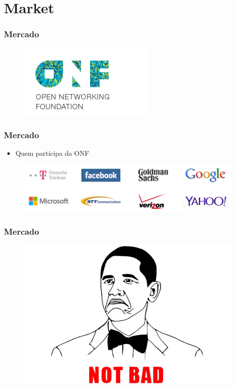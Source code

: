 \section{Market}

%
%
\begin{frame}\frametitle{Mercado}

	\begin{figure}[h]\hspace*{1cm}
        \centering
        \includegraphics[scale=1.0]{images/onf.png}
    \end{figure}
\end{frame}


%
%
\begin{frame}\frametitle{Mercado}

    \begin{itemize}
    \item Quem participa da ONF
    \end{itemize}
    	\begin{figure}[h]\hspace*{-0.3cm}
        \centering
        \includegraphics[scale=0.35]{images/onf-board.png}
    \end{figure}
\end{frame}


%
%
\begin{frame}\frametitle{Mercado}

    	\begin{figure}[h]
        \centering
        \includegraphics[scale=0.2]{images/notbad.png}
    \end{figure}
\end{frame}


